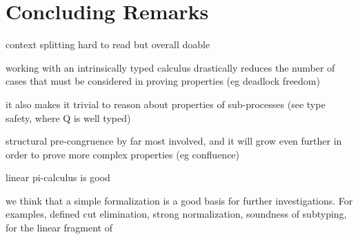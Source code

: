 \section{Concluding Remarks}
\label{sec:conclusion}

context splitting hard to read but overall doable

working with an intrinsically typed calculus drastically reduces the number of
cases that must be considered in proving properties (eg deadlock freedom)

it also makes it trivial to reason about properties of sub-processes (see type
safety, where Q is well typed)

structural pre-congruence by far most involved, and it will grow even further in
order to prove more complex properties (eg confluence)

linear pi-calculus is good

we think that a simple formalization is a good basis for further investigations.
For examples, defined cut elimination, strong normalization, soundness of
subtyping, for the linear fragment of \Calculus